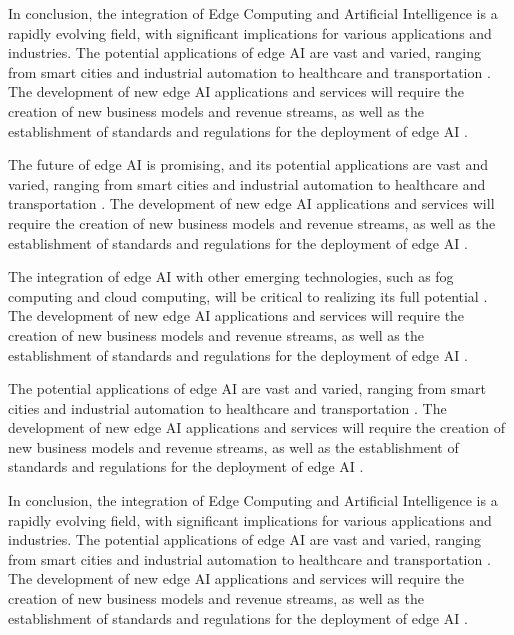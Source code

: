 \documentclass[11pt,a4paper]{article}
\begin{document}
In conclusion, the integration of Edge Computing and Artificial Intelligence is a rapidly evolving field, with significant implications for various applications and industries. The potential applications of edge AI are vast and varied, ranging from smart cities and industrial automation to healthcare and transportation \cite{arxiv:2206.07164}. The development of new edge AI applications and services will require the creation of new business models and revenue streams, as well as the establishment of standards and regulations for the deployment of edge AI \cite{arxiv:2305.01974}. 

The future of edge AI is promising, and its potential applications are vast and varied, ranging from smart cities and industrial automation to healthcare and transportation \cite{arxiv:2301.07803}. The development of new edge AI applications and services will require the creation of new business models and revenue streams, as well as the establishment of standards and regulations for the deployment of edge AI \cite{arxiv:2309.03420}. 

The integration of edge AI with other emerging technologies, such as fog computing and cloud computing, will be critical to realizing its full potential \cite{arxiv:2403.19729}. The development of new edge AI applications and services will require the creation of new business models and revenue streams, as well as the establishment of standards and regulations for the deployment of edge AI \cite{arxiv:2306.17170}. 

The potential applications of edge AI are vast and varied, ranging from smart cities and industrial automation to healthcare and transportation \cite{arxiv:2510.10166}. The development of new edge AI applications and services will require the creation of new business models and revenue streams, as well as the establishment of standards and regulations for the deployment of edge AI \cite{arxiv:2501.14823}. 

In conclusion, the integration of Edge Computing and Artificial Intelligence is a rapidly evolving field, with significant implications for various applications and industries. The potential applications of edge AI are vast and varied, ranging from smart cities and industrial automation to healthcare and transportation \cite{arxiv:2502.15775}. The development of new edge AI applications and services will require the creation of new business models and revenue streams, as well as the establishment of standards and regulations for the deployment of edge AI \cite{arxiv:2403.15665}. 
\end{document}

